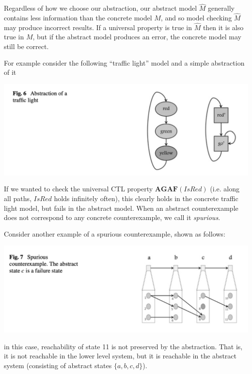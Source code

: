 \documentclass[10pt,a4paper]{article}
\begin{document}
Regardless of how we choose our abstraction, our abstract model $\widehat{M}$ generally contains less information than the concrete model $M$, and so model checking $\widehat{M}$ may produce incorrect results. If a universal property is true in $\widehat{M}$ then it is also true in $M$, but if the abstract model produces an error, the concrete model may still be correct.

For example consider the following ``traffic light'' model and a simple abstraction of it
\begin{center}
    \includegraphics[scale=0.35]{images/cegar1.png}
\end{center}
If we wanted to check the universal CTL property $\textbf{AGAF}(IsRed)$ (i.e. along all paths, $IsRed$ holds infinitely often), this clearly holds in the concrete traffic light model, but fails in the abstract model. When an abstract counterexample does not correspond to any concrete counterexample, we call it \textit{spurious}.

Consider another example of a spurious counterexample, shown as follows:
\begin{center}
    \includegraphics[scale=0.40]{images/cegar2.png}
\end{center}
in this case, reachability of state 11 is not preserved by the abstraction. That is, it is not reachable in the lower level system, but it is reachable in the abstract system (consisting of abstract states $\{a,b,c,d\}$).
\end{document}
